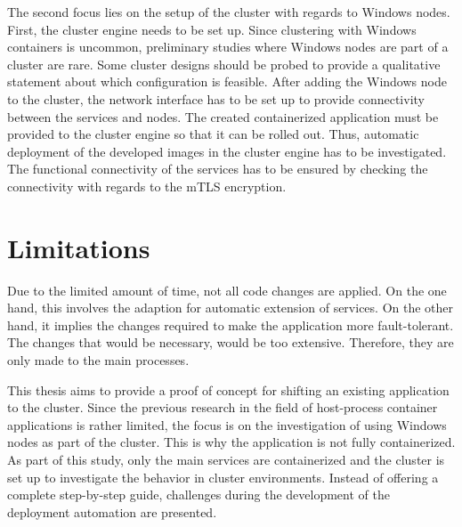 The second focus lies on the setup of the cluster with regards to \ac{Windows} nodes.
First, the cluster engine needs to be set up. Since clustering with \ac{Windows} containers is uncommon, preliminary studies where \ac{Windows} nodes are part of a cluster are rare. Some cluster designs should be probed to provide a qualitative statement about which configuration is feasible.
After adding the \ac{Windows} node to the cluster, the network interface has to be set up to provide connectivity between the services and nodes. 
The created containerized application must be provided to the cluster engine so that it can be rolled out. Thus, automatic deployment of the developed images in the cluster engine has to be investigated. 
The functional connectivity of the services has to be ensured by checking the connectivity with regards to the \ac{mTLS} encryption.


\section{Limitations}
Due to the limited amount of time, not all code changes are applied. On the one hand, this involves the adaption for automatic extension of services. On the other hand, it implies the changes required to make the application more fault-tolerant. The changes that would be necessary, would be too extensive. Therefore, they are only made to the main processes.

This thesis aims to provide a proof of concept for shifting an existing application to the cluster. Since the previous research in the field of host-process container applications is rather limited, the focus is on the investigation of using \ac{Windows} nodes as part of the cluster.
This is why the application is not fully containerized. As part of this study, only the main services are containerized and the cluster is set up to investigate the behavior in cluster environments. 
Instead of offering a complete step-by-step guide, challenges during the development of the deployment automation are presented.
